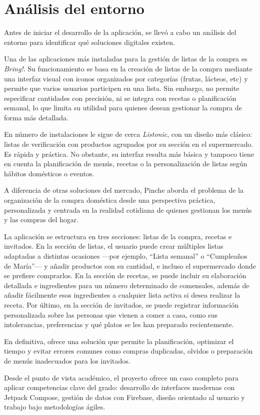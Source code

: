 \section{Análisis del entorno}

Antes de iniciar el desarrollo de la aplicación, se llevó a cabo un análisis del entorno para identificar qué soluciones digitales existen.

Una de las aplicaciones más instaladas para la gestión de listas de la compra es \textit{Bring!}. Su funcionamiento se basa en la creación de listas de la compra mediante una interfaz visual con iconos organizados por categorías (frutas, lácteos, etc) y permite que varios usuarios participen en una lista. Sin embargo, no permite especificar cantidades con precisión, ni se integra con recetas o planificación semanal, lo que limita su utilidad para quienes desean gestionar la compra de forma más detallada.

En número de instalaciones le sigue de cerca \textit{Listonic}, con un diseño más clásico: listas de verificación con productos agrupados por su sección en el supermercado. Es rápida y práctica. No obstante, su interfaz resulta más básica y tampoco tiene en cuenta la planificación de menús, recetas o la personalización de listas según hábitos domésticos o eventos.

A diferencia de otras soluciones del mercado, Pinche aborda el problema de la organización de la compra doméstica desde una perspectiva práctica, personalizada y centrada en la realidad cotidiana de quienes gestionan los menús y las compras del hogar.

La aplicación se estructura en tres secciones: listas de la compra, recetas e invitados. En la sección de listas, el usuario puede crear múltiples listas adaptadas a distintas ocasiones —por ejemplo, “Lista semanal” o “Cumpleaños de María”— y añadir productos con su cantidad, e incluso el supermercado donde se prefiere comprarlos. En la sección de recetas, se puede incluir su elaboración detallada e ingredientes para un número determinado de comensales, además de añadir fácilmente esos ingredientes a cualquier lista activa si desea realizar la receta. Por último, en la sección de invitados, se puede registrar información personalizada sobre las personas que vienen a comer a casa, como sus intolerancias, preferencias y qué platos se les han preparado recientemente.

En definitiva, ofrece una solución que permite la planificación, optimizar el tiempo y evitar errores comunes como compras duplicadas, olvidos o preparación de menús inadecuados para los invitados.

Desde el punto de vista académico, el proyecto ofrece un caso completo para aplicar competencias clave del grado: desarrollo de interfaces modernas con Jetpack Compose, gestión de datos con Firebase, diseño orientado al usuario y trabajo bajo metodologías ágiles.